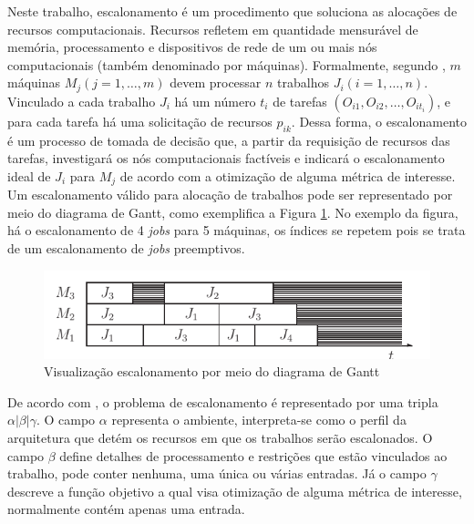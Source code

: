Neste trabalho, escalonamento é um procedimento que soluciona as alocações de recursos computacionais. Recursos refletem em quantidade mensurável de memória, processamento e dispositivos de rede de um ou mais nós computacionais  (também denominado por máquinas). Formalmente, segundo , $m$ máquinas $M_j (j = 1, \dots, m)$ devem processar $n$ trabalhos $J_i (i = 1, \dots, n)$. 
Vinculado a cada trabalho $J_i$ há um número $t_i$ de tarefas $(O_{i1}, O_{i2}, \dots, O_{it_i})$, e para cada tarefa há uma solicitação de recursos $p_{ik}$. 
Dessa forma, o escalonamento é um processo de tomada de decisão que, a partir da requisição de recursos das tarefas,  investigará os nós computacionais  factíveis e indicará o escalonamento ideal de $J_i$ para $M_j$ de acordo com a otimização de alguma métrica de interesse. Um escalonamento válido para alocação de trabalhos pode ser representado por meio do diagrama de Gantt, como exemplifica a Figura \ref{gantt-schedulling}. No exemplo da figura, há o escalonamento de 4 \textit{jobs} para 5 máquinas, os índices se repetem pois se trata de um escalonamento de \textit{jobs} preemptivos.


\begin{figure}[ht!]
    \caption{\label{gantt-schedulling}Visualização escalonamento por meio do diagrama de Gantt}
    \centering
    \includegraphics[width=\linewidth]{assets/gantt-scheduling.pdf}
\end{figure}

De acordo com \cite{pinedo2012scheduling}, o problema de escalonamento é representado por uma tripla $\alpha|\beta|\gamma$. O campo $\alpha$ representa o ambiente, interpreta-se como o perfil da arquitetura que detém os recursos em que os trabalhos serão escalonados. O campo $\beta$ define detalhes de processamento e restrições que estão vinculados ao trabalho, pode conter nenhuma, uma única ou várias entradas. Já o campo $\gamma$ descreve a função objetivo a qual visa otimização de alguma métrica de interesse, normalmente contém apenas uma entrada.

